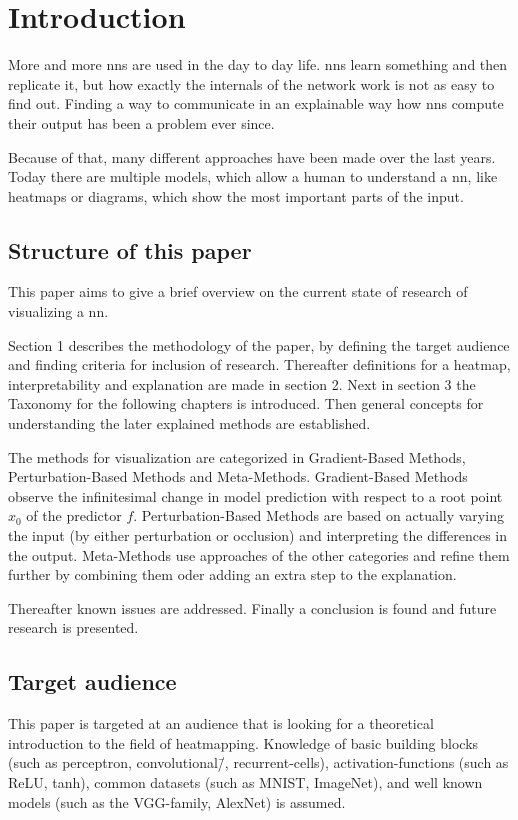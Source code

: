 \section{Introduction}
More and more \glspl{nn} are used in the day to day life. \glspl{nn} learn something and then replicate it, but how exactly the internals of the network work is not as easy to find out. Finding a way to communicate in an explainable way how \glspl{nn} compute their output has been a problem ever since. 
\par 
Because of that, many different approaches have been made over the last years. Today there are multiple models, which allow a human to understand a \gls{nn}, like heatmaps or diagrams, which show the most important parts of the input.

\subsection{Structure of this paper}
This paper aims to give a brief overview on the current state of research of visualizing a \gls{nn}. 
\par 
Section 1 describes the methodology of the paper, by defining the target audience and finding criteria for inclusion of research. Thereafter definitions for a heatmap, interpretability and explanation are made in section 2. Next in section 3 the Taxonomy for the following chapters is introduced. Then general concepts for understanding the later explained methods are established.
\par
The methods for visualization are categorized in Gradient-Based Methods, Perturbation-Based Methods and Meta-Methods.
Gradient-Based Methods observe the infinitesimal change in model prediction with respect to a root point \(x_0\) of the predictor \(f\).
Perturbation-Based Methods are based on actually varying the input (by either  perturbation or occlusion) and interpreting the differences in the output.
Meta-Methods use approaches of the other categories and refine them further by combining them oder adding an extra step to the explanation.
\par
Thereafter known issues are addressed.
Finally a conclusion is found and future research is presented.

\subsection{Target audience}
This paper is targeted at an audience that is looking for a theoretical introduction to the field of heatmapping. Knowledge of basic building blocks (such as perceptron, convolutional\=/, recurrent-cells), activation-functions (such as ReLU, tanh), common datasets (such as MNIST, ImageNet), and well known models (such as the VGG-family, AlexNet) is assumed.

